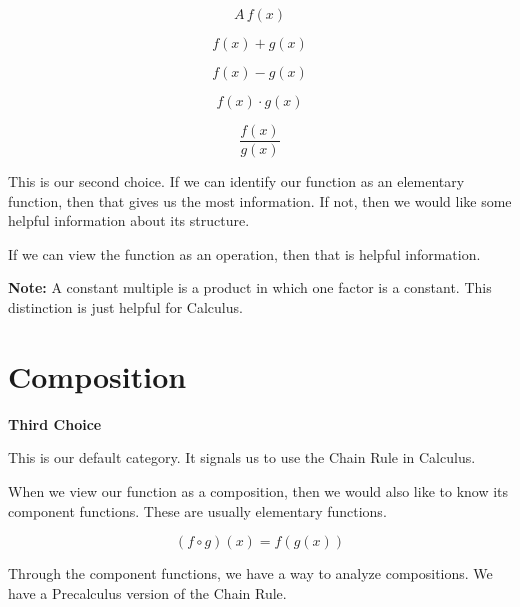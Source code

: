 \documentclass{ximera}
\begin{document}
\[
A \, f(x) 
\]


\[
f(x) + g(x)
\]


\[
f(x) - g(x)
\]


\[
f(x) \cdot g(x)
\]


\[
\frac{f(x)}{g(x)}
\]





This is our second choice.  If we can identify our function as an elementary function, then that gives us the most information. If not, then we would like some helpful information about its structure. 



If we can view the function as an operation, then that is helpful information.


\textbf{Note:} A constant multiple is a product in which one factor is a constant. This distinction is just helpful for Calculus.




































\section*{Composition}


\textbf{\textcolor{purple!85!blue}{Third Choice}} 

This is our default category.  It signals us to use the Chain Rule in Calculus. 


When we view our function as a composition, then we would also like to know its component functions. These are usually elementary functions. 



\[
(f \circ g)(x) = f(g(x))
\]



Through the component functions, we have a way to analyze compositions.  We have a Precalculus version of the Chain Rule.
\end{document}
